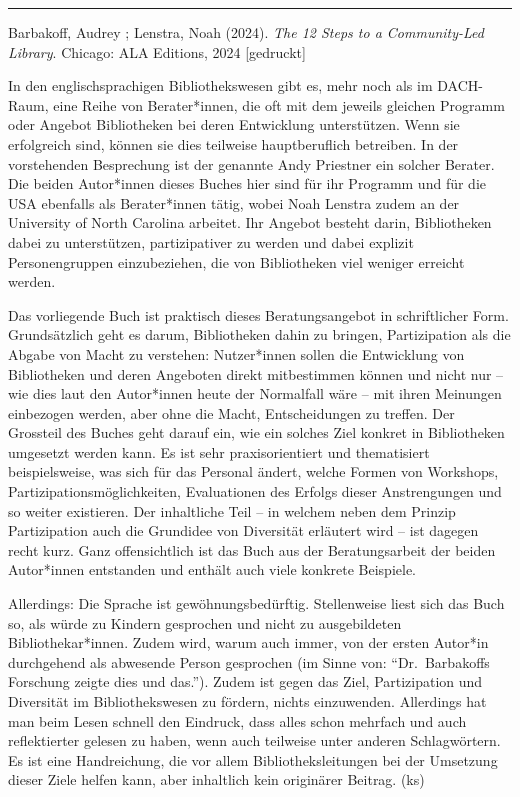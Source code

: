 \documentclass[a4paper,
fontsize=11pt,
oneside,
numbers=noperiodatend,
parskip=half-,
bibliography=totoc,
final
]{scrartcl}
\begin{document}
\begin{center}\rule{0.5\linewidth}{0.5pt}\end{center}

Barbakoff, Audrey ; Lenstra, Noah (2024). \emph{The 12 Steps to a
Community-Led Library}. Chicago: ALA Editions, 2024 {[}gedruckt{]}

In den englischsprachigen Bibliothekswesen gibt es, mehr noch als im
DACH-Raum, eine Reihe von Berater*innen, die oft mit dem jeweils
gleichen Programm oder Angebot Bibliotheken bei deren Entwicklung
unterstützen. Wenn sie erfolgreich sind, können sie dies teilweise
hauptberuflich betreiben. In der vorstehenden Besprechung ist der
genannte Andy Priestner ein solcher Berater. Die beiden Autor*innen
dieses Buches hier sind für ihr Programm und für die USA ebenfalls als
Berater*innen tätig, wobei Noah Lenstra zudem an der University of North
Carolina arbeitet. Ihr Angebot besteht darin, Bibliotheken dabei zu
unterstützen, partizipativer zu werden und dabei explizit
Personengruppen einzubeziehen, die von Bibliotheken viel weniger
erreicht werden.

Das vorliegende Buch ist praktisch dieses Beratungsangebot in
schriftlicher Form. Grundsätzlich geht es darum, Bibliotheken dahin zu
bringen, Partizipation als die Abgabe von Macht zu verstehen:
Nutzer*innen sollen die Entwicklung von Bibliotheken und deren Angeboten
direkt mitbestimmen können und nicht nur – wie dies laut den Autor*innen
heute der Normalfall wäre – mit ihren Meinungen einbezogen werden, aber
ohne die Macht, Entscheidungen zu treffen. Der Grossteil des Buches geht
darauf ein, wie ein solches Ziel konkret in Bibliotheken umgesetzt
werden kann. Es ist sehr praxisorientiert und thematisiert
beispielsweise, was sich für das Personal ändert, welche Formen von
Workshops, Partizipationsmöglichkeiten, Evaluationen des Erfolgs dieser
Anstrengungen und so weiter existieren. Der inhaltliche Teil – in
welchem neben dem Prinzip Partizipation auch die Grundidee von
Diversität erläutert wird – ist dagegen recht kurz. Ganz offensichtlich
ist das Buch aus der Beratungsarbeit der beiden Autor*innen entstanden
und enthält auch viele konkrete Beispiele.

Allerdings: Die Sprache ist gewöhnungsbedürftig. Stellenweise liest sich
das Buch so, als würde zu Kindern gesprochen und nicht zu ausgebildeten
Bibliothekar*innen. Zudem wird, warum auch immer, von der ersten
Autor*in durchgehend als abwesende Person gesprochen (im Sinne von:
\enquote{Dr.~Barbakoffs Forschung zeigte dies und das.}). Zudem ist
gegen das Ziel, Partizipation und Diversität im Bibliothekswesen zu
fördern, nichts einzuwenden. Allerdings hat man beim Lesen schnell den
Eindruck, dass alles schon mehrfach und auch reflektierter gelesen zu
haben, wenn auch teilweise unter anderen Schlagwörtern. Es ist eine
Handreichung, die vor allem Bibliotheksleitungen bei der Umsetzung
dieser Ziele helfen kann, aber inhaltlich kein originärer Beitrag. (ks)
\end{document}
